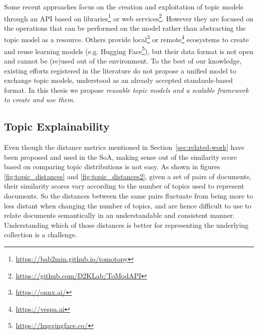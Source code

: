 Some recent approaches focus on the creation and exploitation of topic models through an API based on libraries\footnote{\url{https://bab2min.github.io/tomotopy}} or web services\footnote{\url{https://github.com/D2KLab/ToModAPI}}\citep{Lisena:NLPOSS2020}. However they are focused on the operations that can be performed on the model rather than abstracting the topic model as a resource. Others provide local\footnote{\url{https://onnx.ai/}} or remote\footnote{\url{https://vespa.ai}} ecosystems to create and reuse learning models (e.g. Hugging Face\footnote{\url{https://huggingface.co/}}), but their data format is not open and cannot be (re)used out of the environment. To the best of our knowledge, existing efforts registered in the literature do not propose a unified model to exchange topic models, understood as an already accepted standards-based format. In this thesis we propose \textit{reusable topic models and a scalable framework to create and use them}.  
 

\subsection{Topic Explainability}
\label{sec:topic-explainability}

Even though the distance metrics mentioned in Section~\ref{sec:related-work} have been proposed and used in the SoA, making sense out of the similarity score based on comparing topic distributions is not easy. As shown in figures \ref{fig:topic_distances} and \ref{fig:topic_distances2}, given a set of pairs of documents, their similarity scores vary according to the number of topics used to represent documents. So the distances between the same pairs fluctuate from being more to less distant when changing the number of topics, and are hence difficult to use to relate documents semantically in an understandable and consistent manner. Understanding which of those distances is better for representing the underlying collection is a challenge.


